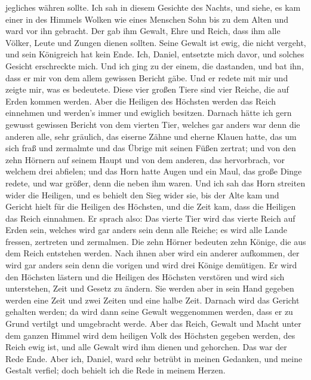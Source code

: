 jegliches währen sollte.  Ich sah in diesem Gesichte des
Nachts, und siehe, es kam einer in des Himmels Wolken wie eines Menschen
Sohn bis zu dem Alten und ward vor ihn gebracht.  Der gab
ihm Gewalt, Ehre und Reich, dass ihm alle Völker, Leute und Zungen
dienen sollten. Seine Gewalt ist ewig, die nicht vergeht, und sein
Königreich hat kein Ende.  Ich, Daniel, entsetzte mich
davor, und solches Gesicht erschreckte mich.  Und ich
ging zu der einem, die dastanden, und bat ihn, dass er mir von dem allem
gewissen Bericht gäbe. Und er redete mit mir und zeigte mir, was es
bedeutete.  Diese vier großen Tiere sind vier Reiche, die
auf Erden kommen werden.  Aber die Heiligen des Höchsten
werden das Reich einnehmen und werden's immer und ewiglich besitzen.
 Darnach hätte ich gern gewusst gewissen Bericht von dem
vierten Tier, welches gar anders war denn die anderen alle, sehr
gräulich, das eiserne Zähne und eherne Klauen hatte, das um sich fraß
und zermalmte und das Übrige mit seinen Füßen zertrat; 
und von den zehn Hörnern auf seinem Haupt und von dem anderen, das
hervorbrach, vor welchem drei abfielen; und das Horn hatte Augen und ein
Maul, das große Dinge redete, und war größer, denn die neben ihm waren.
 Und ich sah das Horn streiten wider die Heiligen, und es
behielt den Sieg wider sie,  bis der Alte kam und Gericht
hielt für die Heiligen des Höchsten, und die Zeit kam, dass die Heiligen
das Reich einnahmen.  Er sprach also: Das vierte Tier
wird das vierte Reich auf Erden sein, welches wird gar anders sein denn
alle Reiche; es wird alle Lande fressen, zertreten und zermalmen.
 Die zehn Hörner bedeuten zehn Könige, die aus dem Reich
entstehen werden. Nach ihnen aber wird ein anderer aufkommen, der wird
gar anders sein denn die vorigen und wird drei Könige demütigen.
 Er wird den Höchsten lästern und die Heiligen des
Höchsten verstören und wird sich unterstehen, Zeit und Gesetz zu ändern.
Sie werden aber in sein Hand gegeben werden eine Zeit und zwei Zeiten
und eine halbe Zeit.  Darnach wird das Gericht gehalten
werden; da wird dann seine Gewalt weggenommen werden, dass er zu Grund
vertilgt und umgebracht werde.  Aber das Reich, Gewalt
und Macht unter dem ganzen Himmel wird dem heiligen Volk des Höchsten
gegeben werden, des Reich ewig ist, und alle Gewalt wird ihm dienen und
gehorchen.  Das war der Rede Ende. Aber ich, Daniel, ward
sehr betrübt in meinen Gedanken, und meine Gestalt verfiel; doch behielt
ich die Rede in meinem Herzen.

